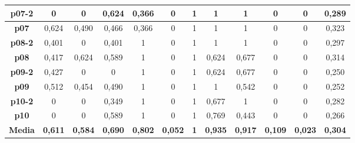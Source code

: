 \documentclass{article}
\begin{document}
\begin{landscape}
\begin{table}[]
\begin{tabular}{|c|c|c|c|c|c|c|c|c|c|c|c|}
    \textbf{p07-2}  &  0      &  0      &  0,624  &  0,366  &  0      &  1      &  1      &  1      &  0      &  0      &  0,289 \\ \hline
    \textbf{p07}    &  0,624  &  0,490  &  0,466  &  0,366  &  0      &  1      &  1      &  1      &  0      &  0      &  0,323 \\ \hline
    \textbf{p08-2}  &  0,401  &  0      &  0,401  &  1      &  0      &  1      &  1      &  1      &  0      &  0      &  0,297 \\ \hline
    \textbf{p08}    &  0,417  &  0,624  &  0,589  &  1      &  0      &  1      &  0,624  &  0,677  &  0      &  0      &  0,314 \\ \hline
    \textbf{p09-2}  &  0,427  &  0      &  0      &  1      &  0      &  1      &  0,624  &  0,677  &  0      &  0      &  0,250 \\ \hline
    \textbf{p09}    &  0,512  &  0,454  &  0,490  &  1      &  0      &  1      &  1      &  0,542  &  0      &  0      &  0,252 \\ \hline
    \textbf{p10-2}  &  0      &  0      &  0,349  &  1      &  0      &  1      &  0,677  &  1      &  0      &  0      &  0,282 \\ \hline
    \textbf{p10}    &  0      &  0      &  0,589  &  1      &  0      &  1      &  0,769  &  0,443  &  0      &  0      &  0,266 \\ \hline
    \textbf{Media}  &  \textbf{0,611}  &  \textbf{0,584}  &  \textbf{0,690}  &  \textbf{0,802}  &  \textbf{0,052}  &  \textbf{1}      &  \textbf{0,935}  &  \textbf{0,917}  &  \textbf{0,109}  &  \textbf{0,023}  &  \textbf{0,304} \\ \hline
    \end{tabular}
    \end{table}
    \end{landscape}
    
\end{document}
